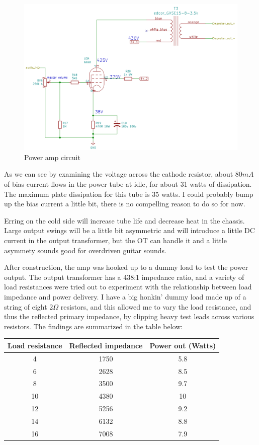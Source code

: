 \documentclass[pdftex,letterpaper,11pt]{article}
\begin{document}
\begin{figure}[H]
\centering
\caption{Power amp circuit}
\includegraphics[width=\textwidth]{power_amp_circuit.png}
\end{figure}

As we can see by examining the voltage across the cathode resistor, about $80mA$ of bias current flows in the power tube at idle, for about 31 watts of dissipation. The maximum plate dissipation for this tube is 35 watts. I could probably bump up the bias current a little bit, there is no compelling reason to do so for now. 

Erring on the cold side will increase tube life and decrease heat in the chassis. Large output swings will be a little bit asymmetric and will introduce a little DC current in the output transformer, but the OT can handle it and a little asymmety sounds good for overdriven guitar sounds.

After construction, the amp was hooked up to a dummy load to test the power output. The output transformer has a 438:1 impedance ratio, and a variety of load resistances were tried out to experiment with the relationship between load impedance and power delivery. I have a big honkin' dummy load made up of a string of eight 2$\Omega$ resistors, and this allowed me to vary the load resistance, and thus the reflected primary impedance, by clipping heavy test leads across various resistors. The findings are summarized in the table below:

\begin{table}[H]
\centering
\begin{tabular}{ c | c | c }
    Load resistance  & Reflected impedance & Power out (Watts)  \\ \hline \hline
	4 & 1750 & 5.8 \\ \hline
	6 & 2628 & 8.5 \\ \hline
	8 & 3500 & 9.7 \\ \hline
	10 & 4380 & 10 \\ \hline
	12 & 5256 & 9.2 \\ \hline
	14 & 6132 & 8.8 \\ \hline
	16 & 7008 & 7.9 \\ \hline
\end{tabular}
\end{table}
\end{document}
